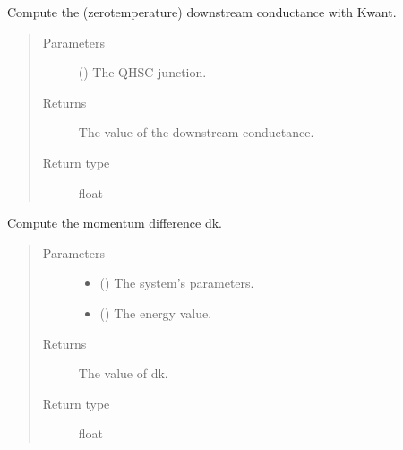 \documentclass[letterpaper,10pt,english]{sphinxmanual}
\begin{document}
\begin{fulllineitems}
\label{\detokenize{modules:modules.utils.compute_downstream_conductance_TB}}
\pysigstartsignatures
{}
\pysigstopsignatures
\sphinxAtStartPar
Compute the (zero\sphinxhyphen{}temperature) downstream conductance with Kwant.
\begin{quote}\begin{description}
\item[{Parameters}] \leavevmode
\sphinxAtStartPar
{} () \textendash{} The QH\sphinxhyphen{}SC junction.

\item[{Returns}] \leavevmode
\sphinxAtStartPar
The value of the downstream conductance.

\item[{Return type}] \leavevmode
\sphinxAtStartPar
float

\end{description}\end{quote}

\end{fulllineitems}


\begin{fulllineitems}
\label{\detokenize{modules:modules.utils.compute_momentum_difference}}
\pysigstartsignatures
{}
\pysigstopsignatures
\sphinxAtStartPar
Compute the momentum difference dk.
\begin{quote}\begin{description}
\item[{Parameters}] \leavevmode\begin{itemize}
\item {} 
\sphinxAtStartPar
{} () \textendash{} The system’s parameters.

\item {} 
\sphinxAtStartPar
{} () \textendash{} The energy value.

\end{itemize}

\item[{Returns}] \leavevmode
\sphinxAtStartPar
The value of dk.

\item[{Return type}] \leavevmode
\sphinxAtStartPar
float

\end{description}\end{quote}

\end{fulllineitems}
\end{document}
